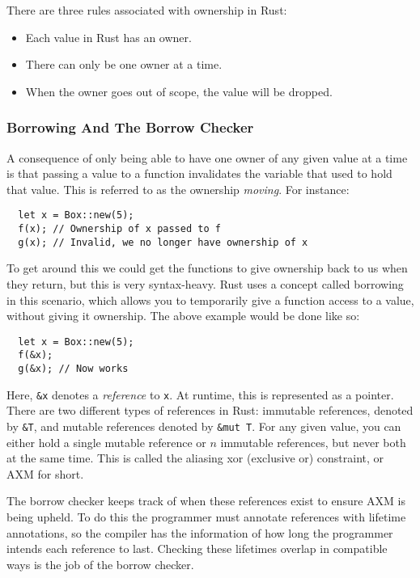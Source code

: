 \documentclass[12pt,twoside]{report}
\begin{document}
There are three rules associated with ownership in Rust:
\begin{itemize}
  \item Each value in Rust has an owner.
  \item There can only be one owner at a time.
  \item When the owner goes out of scope, the value will be dropped.
\end{itemize}

\subsubsection{Borrowing And The Borrow Checker}
A consequence of only being able to have one owner of any given value at a time is that passing a value to a function invalidates the variable that used to hold that value. This is referred to as the ownership \textit{moving}. For instance:

\begin{lstlisting}
  let x = Box::new(5);
  f(x); // Ownership of x passed to f
  g(x); // Invalid, we no longer have ownership of x
\end{lstlisting}

To get around this we could get the functions to give ownership back to us when they return, but this is very syntax-heavy. Rust uses a concept called borrowing in this scenario, which allows you to temporarily give a function access to a value, without giving it ownership. The above example would be done like so:

\begin{lstlisting}
  let x = Box::new(5);
  f(&x);
  g(&x); // Now works
\end{lstlisting}

Here, \verb|&x| denotes a \textit{reference} to \verb|x|. At runtime, this is represented as a pointer. There are two different types of references in Rust: immutable references, denoted by \verb|&T|, and mutable references denoted by \verb|&mut T|. For any given value, you can either hold a single mutable reference or $n$ immutable references, but never both at the same time. This is called the aliasing xor (exclusive or) constraint, or AXM for short.

The borrow checker keeps track of when these references exist to ensure AXM is being upheld. To do this the programmer must annotate references with lifetime annotations, so the compiler has the information of how long the programmer intends each reference to last. Checking these lifetimes overlap in compatible ways is the job of the borrow checker.
\end{document}
